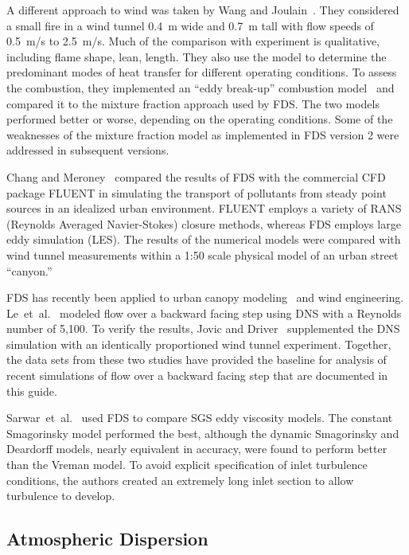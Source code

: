 A  different  approach  to  wind  was  taken  by  Wang  and Joulain~\cite{Wang:IAFSS2002}. They considered a small fire in a wind tunnel 0.4~m wide and 0.7~m tall with flow speeds of 0.5~m/s to 2.5~m/s. Much of the comparison with experiment is qualitative, including flame shape, lean, length. They also use the model to determine the predominant modes of heat transfer for different operating conditions. To assess the combustion, they implemented an ``eddy break-up'' combustion model~\cite{Magnussen:1} and compared it to the mixture fraction approach used by FDS. The two models performed better or worse, depending on the operating conditions. Some of the weaknesses of the mixture fraction model as implemented in FDS version 2 were addressed in subsequent versions.

Chang and Meroney~\cite{ChangJWE2003} compared the results of FDS with the commercial CFD package FLUENT in simulating the transport of pollutants  from steady  point sources  in an  idealized urban environment. FLUENT employs a variety of RANS (Reynolds Averaged Navier-Stokes) closure methods,  whereas FDS employs large eddy simulation (LES).  The results of the numerical models were compared with wind tunnel measurements within a 1:50 scale physical model of an urban street ``canyon.''

FDS has recently been applied to urban canopy modeling~\cite{Moon:2014} and wind engineering. Le~et~al.~\cite{Le:1997} modeled flow over a backward facing step using DNS with a Reynolds number of 5,100.  To verify the results, Jovic and Driver~\cite{JD:1994} supplemented the DNS simulation with an identically proportioned wind tunnel experiment.  Together, the data sets from these two studies have provided the baseline for analysis of recent simulations of flow over a backward facing step that are documented in this guide.

Sarwar~et~al.~\cite{Sarwar:2013} used FDS to compare SGS eddy viscosity models. The constant Smagorinsky model performed the best, although the dynamic Smagorinsky and Deardorff models, nearly equivalent in accuracy, were found to perform better than the Vreman model.  To avoid explicit specification of inlet turbulence conditions, the authors created an extremely long inlet section to allow turbulence to develop.  


\subsection{Atmospheric Dispersion}

